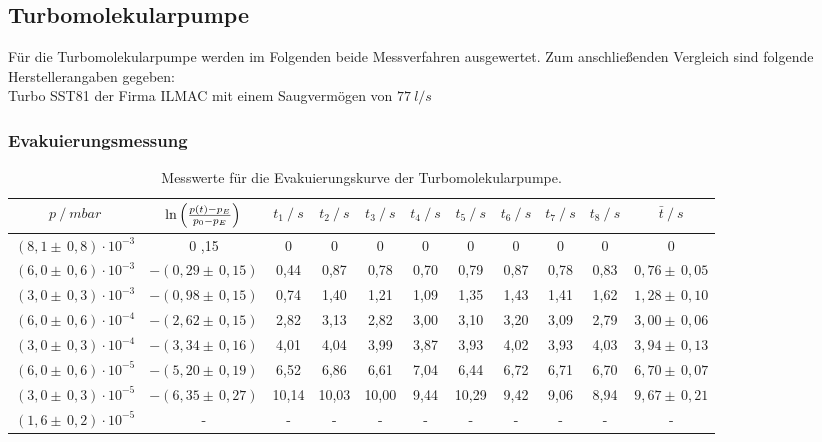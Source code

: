 \subsection{Turbomolekularpumpe}
Für die Turbomolekularpumpe werden im Folgenden beide Messverfahren ausgewertet.
Zum anschließenden Vergleich sind folgende Herstellerangaben\cite{anleitung} gegeben:\\
Turbo SST81 der Firma ILMAC mit einem Saugvermögen von $\SI{77}{l/s}$
\subsubsection{Evakuierungsmessung}
\begin{table}[H]
\tiny
\centering
\begin{tabular}{c|c|c|c|c|c|c|c|c|c|c}
{$p \:/\: \si{mbar}$} & {$\ln{\Bigl( \frac{p(t)-p_E}{p_0-p_E}\Bigr)}$} & {$t_1 \:/\: \si{s} $} & {$t_2 \:/\: \si{s}$} & {$t_3 \:/\: \si{s}$} & {$t_4 \:/\: \si{s}$} & {$t_5 \:/\: \si{s}$} & {$t_6 \:/\: \si{s}$}& {$t_7 \:/\: \si{s}$} & {$t_8 \:/\: \si{s}$} & {$\bar{t} \:/\: \si{s}$}\\
\midrule
$(8,1 \pm \, 0,8)\cdot 10^{-3}$ & 0 \pm 0,15 & 0 &  0 & 0 & 0 & 0 & 0 & 0 & 0 & 0\\
$(6,0 \pm \, 0,6)\cdot 10^{-3}$ & $-(0,29 \pm \, 0,15)$ & 0,44 & 0,87 & 0,78 & 0,70 & 0,79 & 0,87 & 0,78 & 0,83 & $0,76 \pm \, 0,05$\\
$(3,0 \pm \, 0,3)\cdot 10^{-3}$ & $-(0,98 \pm \, 0,15)$ & 0,74 & 1,40 & 1,21 & 1,09 & 1,35 & 1,43 & 1,41 & 1,62 & $1,28 \pm \, 0,10$\\
$(6,0 \pm \, 0,6)\cdot 10^{-4}$ & $-(2,62 \pm \, 0,15)$ & 2,82 & 3,13 & 2,82 & 3,00 & 3,10 & 3,20 & 3,09 & 2,79 & $3,00 \pm \, 0,06$\\
$(3,0 \pm \, 0,3)\cdot 10^{-4}$ & $-(3,34 \pm \, 0,16)$ & 4,01 & 4,04 & 3,99 & 3,87 & 3,93 & 4,02 & 3,93 & 4,03 & $3,94 \pm \, 0,13$\\
$(6,0 \pm \, 0,6)\cdot 10^{-5}$ & $-(5,20 \pm \, 0,19)$ & 6,52 & 6,86 & 6,61 & 7,04 & 6,44 & 6,72 & 6,71 & 6,70 & $6,70 \pm \, 0,07$\\
$(3,0 \pm \, 0,3)\cdot 10^{-5}$ & $-(6,35 \pm \, 0,27)$ & 10,14 & 10,03 & 10,00 & 9,44 & 10,29 & 9,42 & 9,06 & 8,94 & $9,67 \pm \, 0,21$\\
$(1,6 \pm \, 0,2)\cdot 10^{-5}$ & - & - &  -& -& -& -& -& -& -& - \\
\end{tabular}
\caption{Messwerte für die Evakuierungskurve der Turbomolekularpumpe.}
\label{tab:EvakuierungskurveTurbo}
\end{table}

